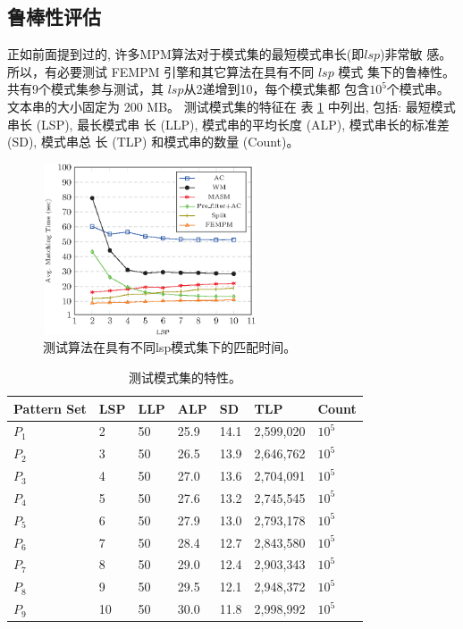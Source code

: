 \subsection{鲁棒性评估}

正如前面提到过的, 许多MPM算法对于模式集的最短模式串长(即$lsp$)非常敏
感。 所以，有必要测试 \textsf{FEMPM} 引擎和其它算法在具有不同 $lsp$ 模式
集下的鲁棒性。 共有9个模式集参与测试，其 $lsp$从2递增到10，每个模式集都
包含$10^5$个模式串。 文本串的大小固定为 200 MB。 测试模式集的特征在
表 \ref{tab:lsps} 中列出, 包括: 最短模式串长 (LSP), 最长模式串
长 (LLP), 模式串的平均长度 (ALP), 模式串长的标准差 (SD), 模式串总
长 (TLP) 和模式串的数量 (Count)。

\begin{figure}[!h]
  \centering
  \includegraphics[height=2in, width=2.5in]{figures/2_MPM/lsp}
  \caption{测试算法在具有不同lsp模式集下的匹配时间。}
  \label{fig:lsp}
\end{figure}


\begin{table}
  \centering
  \caption{测试模式集的特性。}
  \scriptsize
  \label{tab:lsps}
  \begin{tabular}{p{20pt}p{10pt}p{10pt}p{10pt}p{10pt}p{30pt}p{20pt}}
    \hline
    Pattern Set & LSP  & LLP  & ALP & SD & TLP & Count\\
    \hline
    $P_1$ & 2 & 50 & 25.9 & 14.1 & 2,599,020 & $10^5$\\
    $P_2$ & 3 & 50 & 26.5 & 13.9 & 2,646,762 & $10^5$\\
    $P_3$ & 4 & 50 & 27.0 & 13.6 & 2,704,091 & $10^5$\\
    $P_4$ & 5 & 50 & 27.6 & 13.2 & 2,745,545 & $10^5$\\
    $P_5$ & 6 & 50 & 27.9 & 13.0 & 2,793,178 & $10^5$\\
    $P_6$ & 7 & 50 & 28.4 & 12.7 & 2,843,580 & $10^5$\\
    $P_7$ & 8 & 50 & 29.0 & 12.4 & 2,903,343 & $10^5$\\
    $P_8$ & 9 & 50 & 29.5 & 12.1 & 2,948,372 & $10^5$\\
    $P_9$ &10 & 50 & 30.0 & 11.8 & 2,998,992 & $10^5$\\
    \hline
  \end{tabular}
\end{table}



